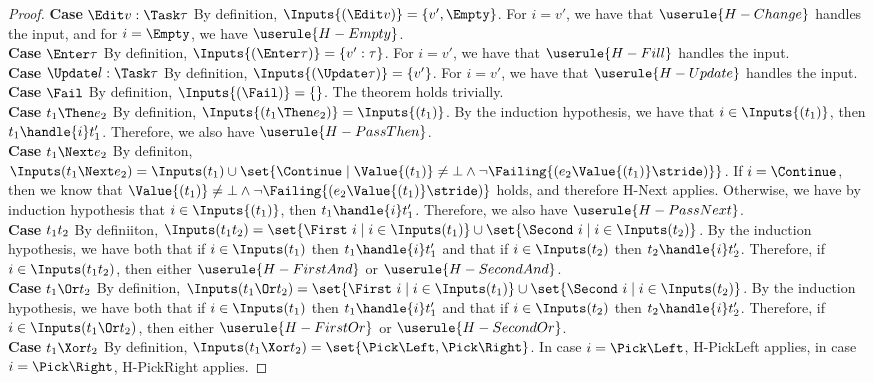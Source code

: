 \begin{proof}
  \noindent\textbf{Case} $\Edit v:\Task\tau$ By definition, $\Inputs{(\Edit v)}=\{v',\Empty\}$. For $i=v'$, we have that $\userule{H-Change}$ handles the input, and for $i=\Empty$, we have $\userule{H-Empty}$.\\

  \noindent\textbf{Case} $\Enter \tau$ By definition, $\Inputs{(\Enter \tau)}=\{v':\tau\}$. For $i=v'$, we have that $\userule{H-Fill}$ handles the input.\\

  \noindent\textbf{Case} $\Update l:\Task\tau$ By definition, $\Inputs{(\Update\tau)}=\{v'\}$. For $i=v'$, we have that $\userule{H-Update}$ handles the input.\\

  \noindent\textbf{Case} $\Fail$ By definition, $\Inputs{(\Fail)}=\{\}$. The theorem holds trivially.\\

  \noindent\textbf{Case} $t_1\Then e_2$ By definition, $\Inputs{(t_1\Then e_2)}=\Inputs{(t_1)}$. By the induction hypothesis, we have that $i\in\Inputs{(t_1)}$, then $t_1\handle{i}t_1'$. Therefore, we also have $\userule{H-PassThen}$.\\

  \noindent\textbf{Case} $t_1\Next e_2$ By definiton, $\Inputs(t_1 \Next e_2) = \Inputs(t_1) \cup \set{\Continue\mid \Value{(t_1)}\neq \bot \wedge \neg\Failing{(e_2 \Value{(t_1)}\stride)}}$. If $i=\Continue$, then we know that $\Value{(t_1)}\neq \bot \wedge \neg\Failing{(e_2 \Value{(t_1)}\stride)}$ holds, and therefore H-Next applies. Otherwise, we have by induction hypothesis that $i\in\Inputs{(t_1)}$, then $t_1\handle{i}t_1'$. Therefore, we also have $\userule{H-PassNext}$.\\

  \noindent\textbf{Case} $t_1\relax t_2$ By definiiton, $\Inputs(t_1\And t_2) = \set{\First\ i \mid i \in \Inputs(t_1)} \cup \set{\Second\ i \mid i \in \Inputs(t_2)}$. By the induction hypothesis, we have both that if $i\in\Inputs(t_1)$ then $t_1\handle{i}t_1'$ and that if $i\in\Inputs(t_2)$ then $t_2\handle{i}t_2'$. Therefore, if $i\in\Inputs(t_1\And t_2)$, then either $\userule{H-FirstAnd}$ or $\userule{H-SecondAnd}$.\\

  \noindent\textbf{Case} $t_1\Or t_2$ By definition, $\Inputs(t_1\Or t_2) = \set{\First\ i \mid i \in \Inputs(t_1)} \cup \set{\Second\ i \mid i \in \Inputs(t_2)}$. By the induction hypothesis, we have both that if $i\in\Inputs(t_1)$ then $t_1\handle{i}t_1'$ and that if $i\in\Inputs(t_2)$ then $t_2\handle{i}t_2'$. Therefore, if $i\in\Inputs(t_1\Or t_2)$, then either $\userule{H-FirstOr}$ or $\userule{H-SecondOr}$.\\

  \noindent\textbf{Case} $t_1\Xor t_2$ By definition, $\Inputs(t_1\Xor t_2) = \set{\Pick \Left, \Pick \Right}$. In case $i=\Pick\Left$, H-PickLeft applies, in case $i=\Pick\Right$, H-PickRight applies.

\end{proof}

